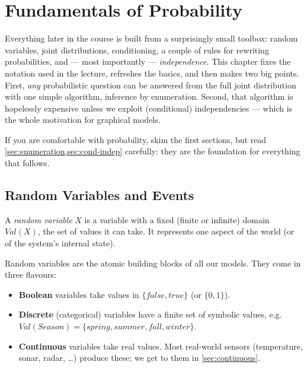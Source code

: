 \documentclass[11pt, oneside]{book}
\newcommand{\Val}{\mathit{Val}}          %
\newcommand{\vn}[1]{\mathit{#1}}         %
\let\originalsection\section
\renewcommand{\section}{\Needspace{7\baselineskip}\originalsection}
\begin{document}
\chapter{Fundamentals of Probability}
\label{ch:prob}

Everything later in the course is built from a surprisingly small toolbox:
random variables, joint distributions, conditioning, a couple of rules for
rewriting probabilities, and --- most importantly --- \emph{independence}. This
chapter fixes the notation used in the lecture, refreshes the basics, and then
makes two big points. First, \emph{any} probabilistic question can be answered
from the full joint distribution with one simple algorithm, inference by
enumeration. Second, that algorithm is hopelessly expensive unless we exploit
(conditional) independencies --- which is the whole motivation for graphical
models.

If you are comfortable with probability, skim the first sections, but read
\cref{sec:enumeration,sec:cond-indep} carefully: they are the foundation for
everything that follows.

\section{Random Variables and Events}

\begin{defbox}[title={Random variable}]
A \emph{random variable} $X$ is a variable with a fixed (finite or infinite)
domain $\Val(X)$, the set of values it can take. It represents one aspect of
the world (or of the system's internal state).
\end{defbox}

Random variables are the atomic building blocks of all our models. They come in
three flavours:
\begin{itemize}
  \item \textbf{Boolean} variables take values in $\{\vn{false}, \vn{true}\}$
    (or $\{0,1\}$).
  \item \textbf{Discrete} (categorical) variables have a finite set of symbolic
    values, e.g.\ $\Val(\vn{Season}) = \{\vn{spring}, \vn{summer}, \vn{fall},
    \vn{winter}\}$.
  \item \textbf{Continuous} variables take real values. Most real-world
    sensors (temperature, sonar, radar, \ldots) produce these; we get to them
    in \cref{sec:continuous}.
\end{itemize}
\end{document}
